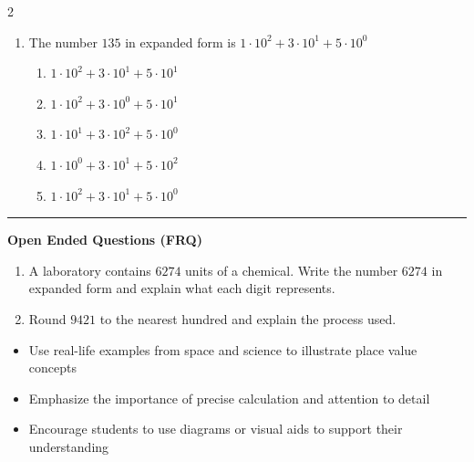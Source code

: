 \documentclass[10pt]{article}
\begin{document}
\begin{multicols}{2}
\begin{enumerate}[label=\textbf{Q\arabic*.}, leftmargin=*, itemsep=6pt, parsep=0pt]
  \item \small The number $135$ in expanded form is $1 \cdot 10^2 + 3 \cdot 10^1 + 5 \cdot 10^0$
  \begin{enumerate}[label=(\Alph*), leftmargin=0.6cm, nosep, itemsep=2pt]
    \item $1 \cdot 10^2 + 3 \cdot 10^1 + 5 \cdot 10^1$
    \item $1 \cdot 10^2 + 3 \cdot 10^0 + 5 \cdot 10^1$
    \item $1 \cdot 10^1 + 3 \cdot 10^2 + 5 \cdot 10^0$
    \item $1 \cdot 10^0 + 3 \cdot 10^1 + 5 \cdot 10^2$
    \item $1 \cdot 10^2 + 3 \cdot 10^1 + 5 \cdot 10^0$
  \end{enumerate}

\end{enumerate}
\end{multicols}

\vspace{-0.2cm}
\hrule
\vspace{0.2cm}
\textbf{\small Open Ended Questions (FRQ)}
\begin{enumerate}[label=\textbf{Q\arabic*.}, start=9, itemsep=5pt, topsep=0pt]

  \item \small A laboratory contains $6274$ units of a chemical. Write the number $6274$ in expanded form and explain what each digit represents. \vspace{2cm}

  \item \small Round $9421$ to the nearest hundred and explain the process used. \vspace{2cm}

\end{enumerate}

\vfill

\begin{tcolorbox}[colback=blue!5, colframe=mainblue!50, title=\small \textbf{Chef's Tips}, fonttitle=\bfseries, bottom=1mm]
\begin{itemize}[noitemsep, topsep=2pt, leftmargin=0.5cm]
  \item \scriptsize Use real-life examples from space and science to illustrate place value concepts\item \scriptsize Emphasize the importance of precise calculation and attention to detail\item \scriptsize Encourage students to use diagrams or visual aids to support their understanding
\end{itemize}
\end{tcolorbox}
\end{document}
